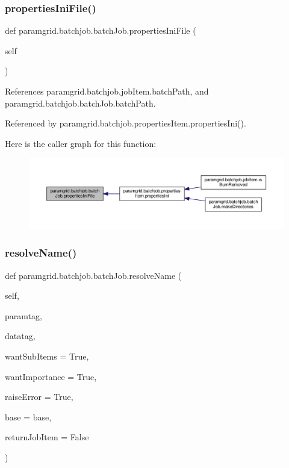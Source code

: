 \subsubsection{\texorpdfstring{properties\+Ini\+File()}{propertiesIniFile()}}
{\footnotesize\ttfamily def paramgrid.\+batchjob.\+batch\+Job.\+properties\+Ini\+File (\begin{DoxyParamCaption}\item[{}]{self }\end{DoxyParamCaption})}



References paramgrid.\+batchjob.\+job\+Item.\+batch\+Path, and paramgrid.\+batchjob.\+batch\+Job.\+batch\+Path.



Referenced by paramgrid.\+batchjob.\+properties\+Item.\+properties\+Ini().

Here is the caller graph for this function\+:
\nopagebreak
\begin{figure}[H]
\begin{center}
\leavevmode
\includegraphics[width=350pt]{classparamgrid_1_1batchjob_1_1batchJob_ab8e3d7402e50140b05dff9d3004d90a1_icgraph}
\end{center}
\end{figure}
\mbox{\label{classparamgrid_1_1batchjob_1_1batchJob_ac178cba753c0e34bf0402ed35db56f51}} 
\subsubsection{\texorpdfstring{resolve\+Name()}{resolveName()}}
{\footnotesize\ttfamily def paramgrid.\+batchjob.\+batch\+Job.\+resolve\+Name (\begin{DoxyParamCaption}\item[{}]{self,  }\item[{}]{paramtag,  }\item[{}]{datatag,  }\item[{}]{want\+Sub\+Items = {\ttfamily True},  }\item[{}]{want\+Importance = {\ttfamily True},  }\item[{}]{raise\+Error = {\ttfamily True},  }\item[{}]{base = {\ttfamily \textquotesingle{}base\textquotesingle{}},  }\item[{}]{return\+Job\+Item = {\ttfamily False} }\end{DoxyParamCaption})}



